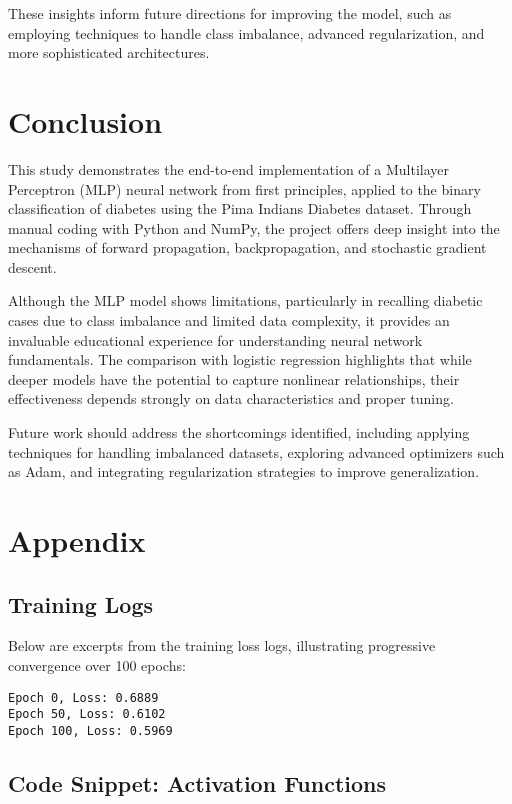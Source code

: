 \documentclass[12pt]{article}
\begin{document}
These insights inform future directions for improving the model, such as employing techniques to handle class imbalance, advanced regularization, and more sophisticated architectures.


\section{Conclusion}

This study demonstrates the end-to-end implementation of a Multilayer Perceptron (MLP) neural network from first principles, applied to the binary classification of diabetes using the Pima Indians Diabetes dataset. Through manual coding with Python and NumPy, the project offers deep insight into the mechanisms of forward propagation, backpropagation, and stochastic gradient descent.

Although the MLP model shows limitations, particularly in recalling diabetic cases due to class imbalance and limited data complexity, it provides an invaluable educational experience for understanding neural network fundamentals. The comparison with logistic regression highlights that while deeper models have the potential to capture nonlinear relationships, their effectiveness depends strongly on data characteristics and proper tuning.

Future work should address the shortcomings identified, including applying techniques for handling imbalanced datasets, exploring advanced optimizers such as Adam, and integrating regularization strategies to improve generalization.

\section*{Appendix}

\subsection*{Training Logs}

Below are excerpts from the training loss logs, illustrating progressive convergence over 100 epochs:

\begin{verbatim}
Epoch 0, Loss: 0.6889
Epoch 50, Loss: 0.6102
Epoch 100, Loss: 0.5969
\end{verbatim}

\subsection*{Code Snippet: Activation Functions}
\end{document}
